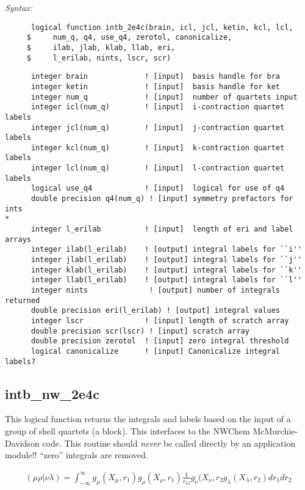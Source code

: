 {\it Syntax:} 
\begin{verbatim} 
      logical function intb_2e4c(brain, icl, jcl, ketin, kcl, lcl, 
     $     num_q, q4, use_q4, zerotol, canonicalize, 
     $     ilab, jlab, klab, llab, eri, 
     $     l_erilab, nints, lscr, scr) 
\end{verbatim} 
\begin{verbatim} 
      integer brain             ! [input]  basis handle for bra  
      integer ketin             ! [input]  basis handle for ket  
      integer num_q             ! [input]  number of quartets input 
      integer icl(num_q)        ! [input]  i-contraction quartet labels 
      integer jcl(num_q)        ! [input]  j-contraction quartet labels 
      integer kcl(num_q)        ! [input]  k-contraction quartet labels 
      integer lcl(num_q)        ! [input]  l-contraction quartet labels 
      logical use_q4            ! [input]  logical for use of q4 
      double precision q4(num_q) ! [input] symmetry prefactors for ints 
*      
      integer l_erilab          ! [input]  length of eri and label arrays 
      integer ilab(l_erilab)    ! [output] integral labels for ``i''  
      integer jlab(l_erilab)    ! [output] integral labels for ``j''  
      integer klab(l_erilab)    ! [output] integral labels for ``k''  
      integer llab(l_erilab)    ! [output] integral labels for ``l''  
      integer nints              ! [output] number of integrals returned 
      double precision eri(l_erilab) ! [output] integral values 
      integer lscr              ! [input] length of scratch array 
      double precision scr(lscr) ! [input] scratch array 
      double precision zerotol  ! [input] zero integral threshold 
      logical canonicalize      ! [input] Canonicalize integral labels? 
\end{verbatim} 
 
\subsection{intb\_nw\_2e4c} 
This logical function returns the integrals and labels based on the 
input of a group of shell quartets (a block).  This interfaces to 
the NWChem McMurchie-Davidson code.  This routine should {\it never} 
be called directly by an application module!! 
``zero'' integrals are removed. 
 
\begin{eqnarray*} 
({\mu}{\rho}|{\nu}{\lambda}) = \int_{-\infty}^{\infty} g_{\mu}(X_{\mu},r_{1})g_{\rho}(X_{\rho},r_{1})\frac{1}{r_{12}}g_{\nu}
(X_{\nu},r_{2}g_{\lambda}(X_{\lambda},r_{2})dr_{1}dr_{2} 
\end{eqnarray*} 
 
